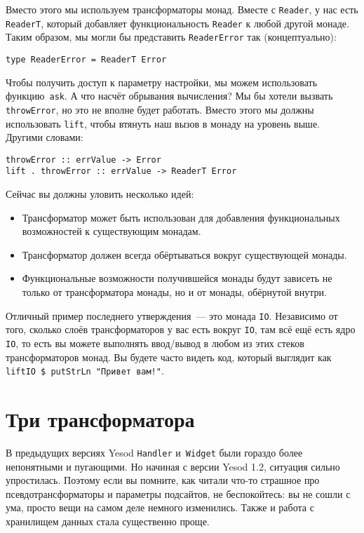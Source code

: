 Вместо этого мы используем трансформаторы монад. Вместе с \lstinline'Reader', у
нас есть \lstinline'ReaderT', который добавляет функциональность
\lstinline'Reader' к любой другой монаде. Таким образом, мы могли бы представить
\lstinline'ReaderError' так (концептуально):
\begin{lstlisting}
type ReaderError = ReaderT Error
\end{lstlisting}

Чтобы получить доступ к параметру настройки, мы можем использовать
функцию~\lstinline'ask'. А что насчёт обрывания вычисления? Мы бы хотели вызвать
\lstinline'throwError', но это не вполне будет работать. Вместо этого мы должны
использовать \lstinline'lift', чтобы втянуть наш вызов в монаду на уровень
выше. Другими словами:
\begin{lstlisting}
throwError :: errValue -> Error
lift . throwError :: errValue -> ReaderT Error
\end{lstlisting}

Сейчас вы должны уловить несколько идей:
\begin{itemize}
    \item  Трансформатор может быть использован для добавления функциональных
        возможностей к существующим монадам.
    \item  Трансформатор должен всегда обёртываться вокруг существующей монады.
    \item  Функциональные возможности получившейся монады будут зависеть не
        только от трансформатора монады, но и от монады, обёрнутой внутри.
\end{itemize}

Отличный пример последнего утверждения~--- это монада \lstinline'IO'. Независимо
от того, сколько слоёв трансформаторов у вас есть вокруг \lstinline'IO', там всё
ещё есть ядро \lstinline'IO', то есть вы можете выполнять ввод/вывод в любом из
этих стеков трансформаторов монад. Вы будете часто видеть код, который выглядит
как \lstinline'liftIO $ putStrLn "Привет вам!"'.

\section{Три трансформатора}
\begin{remark}
    В предыдущих версиях Yesod \lstinline'Handler' и~\lstinline'Widget' были
    гораздо более непонятными и пугающими. Но начиная с версии Yesod 1.2,
    ситуация сильно упростилась. Поэтому если вы помните, как читали что-то
    страшное про псевдотрансформаторы и параметры подсайтов, не беспокойтесь:
    вы не сошли с ума, просто вещи на самом деле немного изменились. Также и
    работа с хранилищем данных стала существенно проще.
\end{remark}

